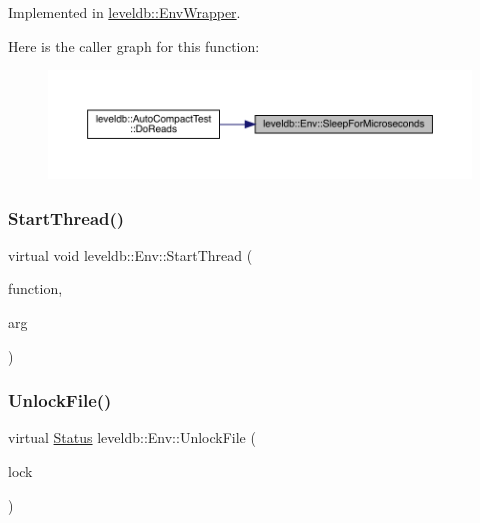 Implemented in \mbox{\hyperlink{classleveldb_1_1_env_wrapper_a2758834cf036084788c2504caebc5019}{leveldb\+::\+Env\+Wrapper}}.

Here is the caller graph for this function\+:
\nopagebreak
\begin{figure}[H]
\begin{center}
\leavevmode
\includegraphics[width=350pt]{classleveldb_1_1_env_a43ad838cfb08db3d9e2197800cd33312_icgraph}
\end{center}
\end{figure}
\mbox{\label{classleveldb_1_1_env_a25eafd1622a2cf2a415ee8b2325bc808}} 
\subsubsection{\texorpdfstring{StartThread()}{StartThread()}}
{\footnotesize\ttfamily virtual void leveldb\+::\+Env\+::\+Start\+Thread (\begin{DoxyParamCaption}\item[{void($\ast$)(void $\ast$arg)}]{function,  }\item[{void $\ast$}]{arg }\end{DoxyParamCaption})\hspace{0.3cm}{\ttfamily [pure virtual]}}

\mbox{\label{classleveldb_1_1_env_a194a2ee3c21bc0b204ad0e5bc3b81d4b}} 
\subsubsection{\texorpdfstring{UnlockFile()}{UnlockFile()}}
{\footnotesize\ttfamily virtual \mbox{\hyperlink{classleveldb_1_1_status}{Status}} leveldb\+::\+Env\+::\+Unlock\+File (\begin{DoxyParamCaption}\item[{\mbox{\hyperlink{classleveldb_1_1_file_lock}{File\+Lock}} $\ast$}]{lock }\end{DoxyParamCaption})\hspace{0.3cm}{\ttfamily [pure virtual]}}




